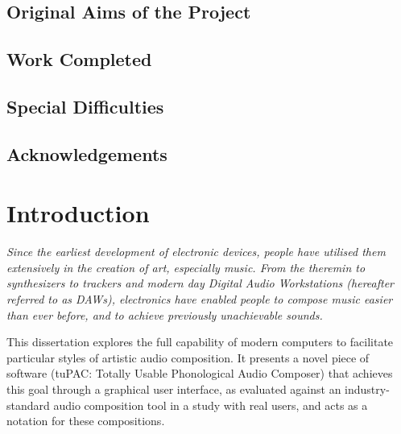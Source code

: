 \documentclass[12pt,a4paper,oneside,openright]{report}
\begin{document}
\section*{Original Aims of the Project}




\section*{Work Completed}


\section*{Special Difficulties}


\newpage

\tableofcontents

\listoffigures

\newpage
\section*{Acknowledgements}



\pagestyle{headings}



\chapter{Introduction}
\textit{
Since the earliest development of electronic devices, people have utilised them extensively in the creation of art, especially music. From the theremin to synthesizers to trackers and modern day Digital Audio Workstations (hereafter referred to as DAWs), electronics have enabled people to compose music easier than ever before, and to achieve previously unachievable sounds.
}

This dissertation explores the full capability of modern computers to facilitate particular styles of artistic audio composition. It presents a novel piece of software (tuPAC: Totally Usable Phonological Audio Composer) that achieves this goal through a graphical user interface, as evaluated against an industry-standard audio composition tool in a study with real users, and acts as a notation for these compositions.
 
\end{document}
